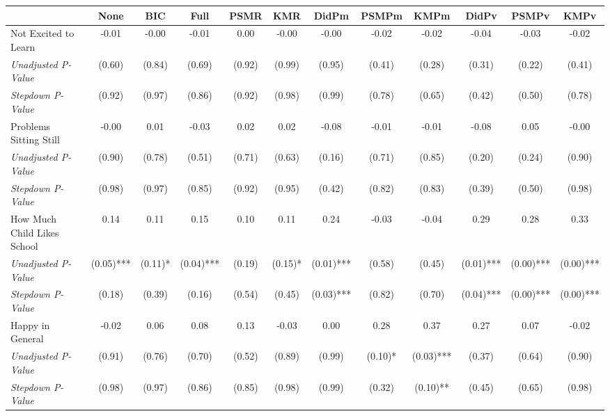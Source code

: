 \begin{tabular}{l c c c c c c c c c c c}
\toprule
 & None & BIC & Full & PSMR & KMR & DidPm & PSMPm & KMPm & DidPv & PSMPv & KMPv \\
\midrule
Not Excited to Learn & -0.01 & -0.00 & -0.01 & 0.00 & -0.00 & -0.00 & -0.02 & -0.02 & -0.04 & -0.03 & -0.02 \\
\quad \textit{Unadjusted P-Value} & (0.60) & (0.84) & (0.69) & (0.92) & (0.99) & (0.95) & (0.41) & (0.28) & (0.31) & (0.22) & (0.41) \\
\quad \textit{Stepdown P-Value} & (0.92) & (0.97) & (0.86) & (0.92) & (0.98) & (0.99) & (0.78) & (0.65) & (0.42) & (0.50) & (0.78) \\
Problems Sitting Still & -0.00 & 0.01 & -0.03 & 0.02 & 0.02 & -0.08 & -0.01 & -0.01 & -0.08 & 0.05 & -0.00 \\
\quad \textit{Unadjusted P-Value} & (0.90) & (0.78) & (0.51) & (0.71) & (0.63) & (0.16) & (0.71) & (0.85) & (0.20) & (0.24) & (0.90) \\
\quad \textit{Stepdown P-Value} & (0.98) & (0.97) & (0.85) & (0.92) & (0.95) & (0.42) & (0.82) & (0.83) & (0.39) & (0.50) & (0.98) \\
How Much Child Likes School & 0.14 & 0.11 & 0.15 & 0.10 & 0.11 & 0.24 & -0.03 & -0.04 & 0.29 & 0.28 & 0.33 \\
\quad \textit{Unadjusted P-Value} & (0.05)*** & (0.11)* & (0.04)*** & (0.19) & (0.15)* & (0.01)*** & (0.58) & (0.45) & (0.01)*** & (0.00)*** & (0.00)*** \\
\quad \textit{Stepdown P-Value} & (0.18) & (0.39) & (0.16) & (0.54) & (0.45) & (0.03)*** & (0.82) & (0.70) & (0.04)*** & (0.00)*** & (0.00)*** \\
Happy in General & -0.02 & 0.06 & 0.08 & 0.13 & -0.03 & 0.00 & 0.28 & 0.37 & 0.27 & 0.07 & -0.02 \\
\quad \textit{Unadjusted P-Value} & (0.91) & (0.76) & (0.70) & (0.52) & (0.89) & (0.99) & (0.10)* & (0.03)*** & (0.37) & (0.64) & (0.90) \\
\quad \textit{Stepdown P-Value} & (0.98) & (0.97) & (0.86) & (0.85) & (0.98) & (0.99) & (0.32) & (0.10)** & (0.45) & (0.65) & (0.98) \\
\bottomrule
\end{tabular}
